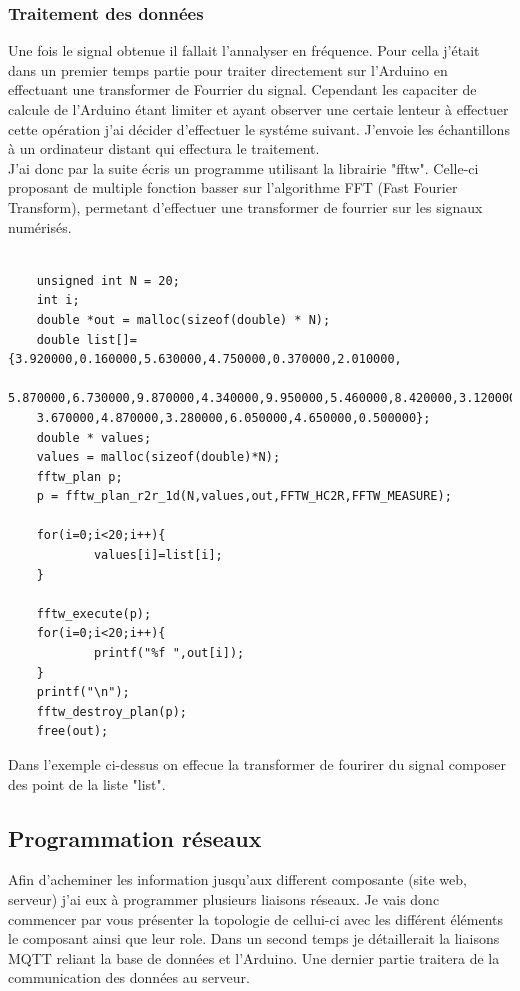 \documentclass[11pt,french,a4paper]{article}
\begin{document}
\subsubsection{Traitement des données}
Une fois le signal obtenue il fallait l'annalyser en fréquence. Pour cella j'était dans un premier temps partie pour traiter directement sur l'Arduino en effectuant une transformer de Fourrier du signal. Cependant les capaciter de calcule de l'Arduino étant limiter et ayant observer une certaie lenteur à effectuer cette opération j'ai décider d'effectuer le systéme suivant. J'envoie les échantillons à un ordinateur distant qui effectura le traitement.\\
J'ai donc par la suite écris un programme utilisant la librairie "fftw". Celle-ci proposant de multiple fonction basser sur l'algorithme FFT (Fast Fourier Transform), permetant d'effectuer une transformer de fourrier sur les signaux numérisés.

\begin{scriptsize}
\begin{lstlisting}

	unsigned int N = 20;
	int i;
	double *out = malloc(sizeof(double) * N);
	double list[]={3.920000,0.160000,5.630000,4.750000,0.370000,2.010000,
	5.870000,6.730000,9.870000,4.340000,9.950000,5.460000,8.420000,3.120000,
	3.670000,4.870000,3.280000,6.050000,4.650000,0.500000};
	double * values;
	values = malloc(sizeof(double)*N);
	fftw_plan p;
	p = fftw_plan_r2r_1d(N,values,out,FFTW_HC2R,FFTW_MEASURE);
	
	for(i=0;i<20;i++){
			values[i]=list[i];
	}
	
	fftw_execute(p);
	for(i=0;i<20;i++){
			printf("%f ",out[i]);
	}
	printf("\n");
	fftw_destroy_plan(p);
	free(out);
\end{lstlisting}
\end{scriptsize}


Dans l'exemple ci-dessus on effecue la transformer de fourirer du signal composer des point de la liste "list". 
\subsection{Programmation réseaux}
Afin d'acheminer les information jusqu'aux different composante (site web, serveur) j'ai eux à programmer plusieurs liaisons réseaux. Je vais donc commencer par vous présenter la topologie de cellui-ci avec les différent éléments le composant ainsi que leur role. Dans un second temps je détaillerait la liaisons MQTT reliant la base de données et l'Arduino. Une dernier partie traitera de la communication des données au serveur.
\end{document}
